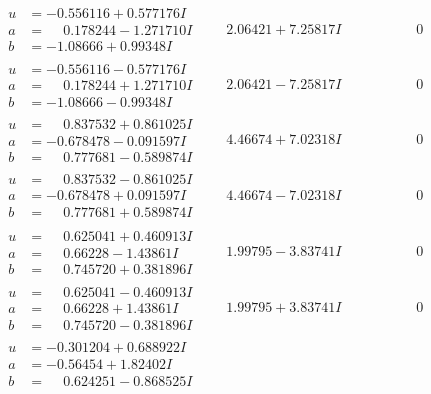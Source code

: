 \documentclass[1p]{elsarticle_modified}
\theoremstyle{definition}
\begin{document}
$$\begin{array}{c|c|c}
\begin{aligned}
u &= -0.556116 + 0.577176 I \\
a &= \phantom{-}0.178244 - 1.271710 I \\
b &= -1.08666 + 0.99348 I\end{aligned}
 & \phantom{-}2.06421 + 7.25817 I & \phantom{-0.000000 } 0 \\ \hline\begin{aligned}
u &= -0.556116 - 0.577176 I \\
a &= \phantom{-}0.178244 + 1.271710 I \\
b &= -1.08666 - 0.99348 I\end{aligned}
 & \phantom{-}2.06421 - 7.25817 I & \phantom{-0.000000 } 0 \\ \hline\begin{aligned}
u &= \phantom{-}0.837532 + 0.861025 I \\
a &= -0.678478 - 0.091597 I \\
b &= \phantom{-}0.777681 - 0.589874 I\end{aligned}
 & \phantom{-}4.46674 + 7.02318 I & \phantom{-0.000000 } 0 \\ \hline\begin{aligned}
u &= \phantom{-}0.837532 - 0.861025 I \\
a &= -0.678478 + 0.091597 I \\
b &= \phantom{-}0.777681 + 0.589874 I\end{aligned}
 & \phantom{-}4.46674 - 7.02318 I & \phantom{-0.000000 } 0 \\ \hline\begin{aligned}
u &= \phantom{-}0.625041 + 0.460913 I \\
a &= \phantom{-}0.66228 - 1.43861 I \\
b &= \phantom{-}0.745720 + 0.381896 I\end{aligned}
 & \phantom{-}1.99795 - 3.83741 I & \phantom{-0.000000 } 0 \\ \hline\begin{aligned}
u &= \phantom{-}0.625041 - 0.460913 I \\
a &= \phantom{-}0.66228 + 1.43861 I \\
b &= \phantom{-}0.745720 - 0.381896 I\end{aligned}
 & \phantom{-}1.99795 + 3.83741 I & \phantom{-0.000000 } 0 \\ \hline\begin{aligned}
u &= -0.301204 + 0.688922 I \\
a &= -0.56454 + 1.82402 I \\
b &= \phantom{-}0.624251 - 0.868525 I\end{aligned}

\end{array}$$
\end{document}
